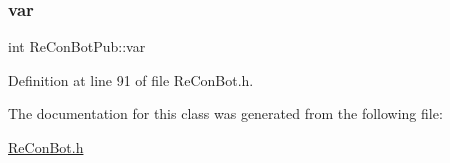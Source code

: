 \subsubsection{\texorpdfstring{var}{var}}
{\footnotesize\ttfamily int Re\+Con\+Bot\+Pub\+::var\hspace{0.3cm}{\ttfamily [protected]}}



Definition at line 91 of file Re\+Con\+Bot.\+h.



The documentation for this class was generated from the following file\+:\begin{DoxyCompactItemize}
\item 
\hyperlink{_re_con_bot_8h}{Re\+Con\+Bot.\+h}\end{DoxyCompactItemize}
